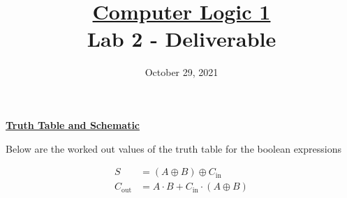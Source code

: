 \documentclass[a4paper]{article}
\title{\underline{Computer Logic 1}\\ {\small Lab 2 - Deliverable}}
\date{October 29, 2021}
\begin{document}
\maketitle
\hr
\newpage


\vspace*{\fill}
\begin{center}
  {\Huge\textbf{\underline{Truth Table and Schematic}}}
\end{center}
\vspace*{\fill}
\newpage

Below are the worked out values of the truth table for the boolean expressions 

\begin{align*}
  S &= (A \oplus B) \oplus C_{\text{in}}\\
  C_{\text{out}} &= A \cdot B + C_{\text{in}} \cdot (A \oplus B)
\end{align*}
\end{document}
